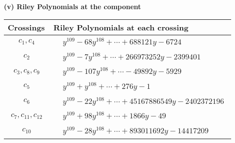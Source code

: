 \documentclass[1p]{elsarticle_modified}
\theoremstyle{definition}
\begin{document}
\newpage\renewcommand{\arraystretch}{1}
\flushleft \textbf{(v) Riley Polynomials at the component}\newline \\
\begin{tabular}{m{50pt}|m{274pt}}
Crossings & \hspace{64pt}Riley Polynomials at each crossing \\
\hline $$\begin{aligned}c_{1},c_{4}\end{aligned}$$&$\begin{aligned}
&y^{109}-68 y^{108}+\cdots+688121 y-6724
\end{aligned}$\\
\hline $$\begin{aligned}c_{2}\end{aligned}$$&$\begin{aligned}
&y^{109}-7 y^{108}+\cdots+266973252 y-2399401
\end{aligned}$\\
\hline $$\begin{aligned}c_{3},c_{8},c_{9}\end{aligned}$$&$\begin{aligned}
&y^{109}-107 y^{108}+\cdots-49892 y-5929
\end{aligned}$\\
\hline $$\begin{aligned}c_{5}\end{aligned}$$&$\begin{aligned}
&y^{109}+y^{108}+\cdots+276 y-1
\end{aligned}$\\
\hline $$\begin{aligned}c_{6}\end{aligned}$$&$\begin{aligned}
&y^{109}-22 y^{108}+\cdots+45167886549 y-2402372196
\end{aligned}$\\
\hline $$\begin{aligned}c_{7},c_{11},c_{12}\end{aligned}$$&$\begin{aligned}
&y^{109}+98 y^{108}+\cdots+1866 y-49
\end{aligned}$\\
\hline $$\begin{aligned}c_{10}\end{aligned}$$&$\begin{aligned}
&y^{109}-28 y^{108}+\cdots+893011692 y-14417209
\end{aligned}$\\
\hline
\end{tabular}\\~\\
\end{document}
